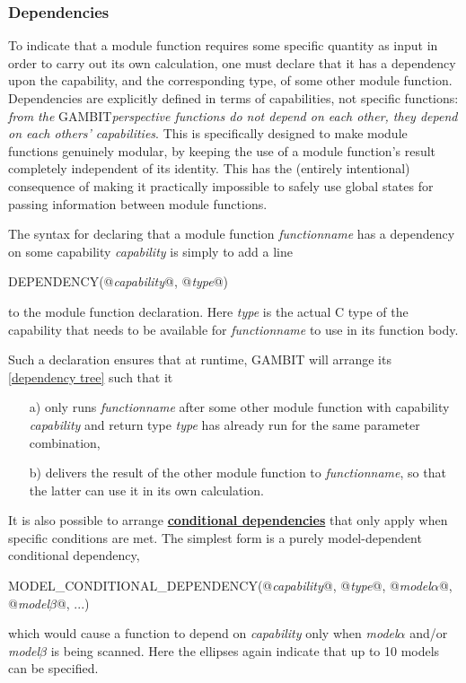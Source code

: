 \documentclass[pdftex,twocolumn,epjc3_preprint,runningheads]{svjour3}
\renewcommand{\_}{\discretionary{\underscore}{}{\underscore}}
\newcommand{\cross}[1]{\ref{#1}}
\newcommand{\doublecross}[2]{\hyperref[#2]{\textbf{#1}}}
\newcommand{\metavarf}[1]{\textit{\color{darkgreen}\footnotesize\textrm{#1}}}
\newcommand{\metavar}{\metavarf}
\newcommand{\gambit}{\textsf{GAMBIT}\xspace}
\newcommand{\GB}{\gambit}
\newcommand\xx{\raisebox{0.2ex}{\smaller ++}\xspace}
\newcommand\Cpp{\textsf{C\xx}\xspace}
\begin{document}
\subsubsection{Dependencies}
\label{declaration_deps}

To indicate that a module function requires some specific quantity as input in order to carry out its own calculation, one must declare that it has a dependency upon the capability, and the corresponding type, of some other module function.  Dependencies are explicitly defined in terms of capabilities, not specific functions: \textit{from the} \GB \textit{perspective functions do not depend on each other, they depend on each others' capabilities}.  This is specifically designed to make module functions genuinely modular, by keeping the use of a module function's result completely independent of its identity.  This has the (entirely intentional) consequence of making it practically impossible to safely use global states for passing information between module functions.

The syntax for declaring that a module function \metavar{function\_name} has a dependency on some capability \metavar{capability} is simply to add a line
\begin{lstcpp}
DEPENDENCY(@\metavar{capability}@, @\metavar{type}@)
\end{lstcpp}
to the module function declaration.  Here \metavar{type} is the actual \Cpp type of the capability that needs to be available for \metavar{function\_name} to use in its function body.

Such a declaration ensures that at runtime, \GB will arrange its \cross{dependency tree} such that it
\begin{itemize}
\item[a)] only runs \metavar{function\_name} after some other module function with capability \metavar{capability} and return type \metavar{type} has already run for the same parameter combination,
\item[b)] delivers the result of the other module function to \metavar{function\_name}, so that the latter can use it in its own calculation.
\end{itemize}

It is also possible to arrange \doublecross{conditional dependencies}{conditional dependency} that only apply when specific conditions are met.  The simplest form is a purely model-dependent conditional dependency,
\begin{lstcpp}
MODEL_CONDITIONAL_DEPENDENCY(@\metavar{capability}@, @\metavar{type}@,
 @\metavar{model\_$\alpha$}@, @\metavar{model\_$\beta$}@, ...)
\end{lstcpp}
which would cause a function to depend on \metavar{capability} only when \metavar{model\_$\alpha$} and/or \metavar{model\_$\beta$} is being scanned.  Here the ellipses again indicate that up to 10 models can be specified.
\end{document}
